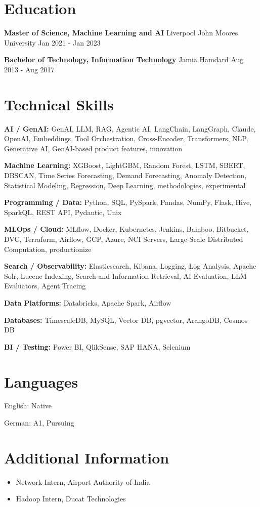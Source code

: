 \documentclass[10pt,a4paper]{article}
\begin{document}
\section{Education}
\textbf{Master of Science, Machine Learning and AI} \textbar{} Liverpool John Moores University \hfill Jan 2021 - Jan 2023\par
\textbf{Bachelor of Technology, Information Technology} \textbar{} Jamia Hamdard \hfill Aug 2013 - Aug 2017\par

\section{Technical Skills}
\textbf{AI / GenAI:} GenAI, LLM, RAG, Agentic AI, LangChain, LangGraph, Claude, OpenAI, Embeddings, Tool Orchestration, Cross-Encoder, Transformers, NLP, Generative AI, GenAI-based product features, innovation\par
\textbf{Machine Learning:} XGBoost, LightGBM, Random Forest, LSTM, SBERT, DBSCAN, Time Series Forecasting, Demand Forecasting, Anomaly Detection, Statistical Modeling, Regression, Deep Learning, methodologies, experimental\par
\textbf{Programming / Data:} Python, SQL, PySpark, Pandas, NumPy, Flask, Hive, SparkQL, REST API, Pydantic, Unix\par
\textbf{MLOps / Cloud:} MLflow, Docker, Kubernetes, Jenkins, Bamboo, Bitbucket, DVC, Terraform, Airflow, GCP, Azure, NCI Servers, Large-Scale Distributed Computation, productionize\par
\textbf{Search / Observability:} Elasticsearch, Kibana, Logging, Log Analysis, Apache Solr, Lucene Indexing, Search and Information Retrieval, AI Evaluation, LLM Evaluators, Agent Tracing\par
\textbf{Data Platforms:} Databricks, Apache Spark, Airflow\par
\textbf{Databases:} TimescaleDB, MySQL, Vector DB, pgvector, ArangoDB, Cosmos DB\par
\textbf{BI / Testing:} Power BI, QlikSense, SAP HANA, Selenium\par

\section{Languages}
English: Native\par
German: A1, Pursuing\par

\section{Additional Information}
\begin{itemize}
  \item Network Intern, Airport Authority of India
  \item Hadoop Intern, Ducat Technologies
\end{itemize}
\end{document}
